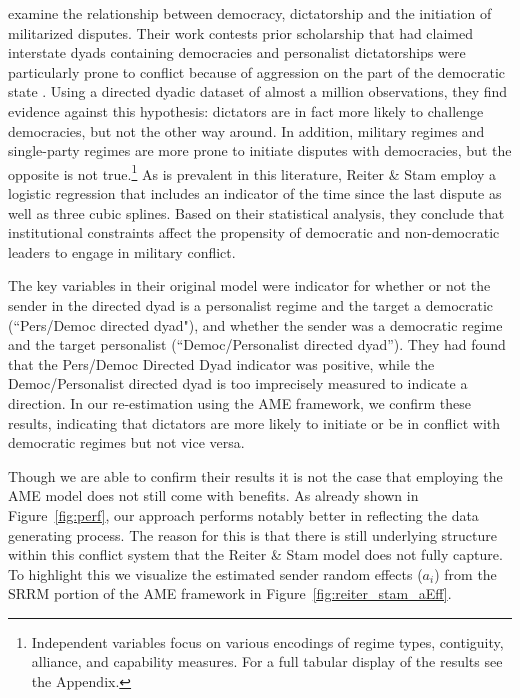 \citet{reiter:stam:2003} examine the relationship between democracy, dictatorship and the initiation of militarized disputes. Their work contests prior scholarship that had claimed interstate dyads containing democracies and personalist dictatorships were particularly prone to conflict because of aggression on the part of the democratic state \citep{peceny:etal:2002}. Using a directed dyadic dataset of almost a million observations, they find evidence against this hypothesis: dictators are in fact more likely to challenge democracies, but not the other way around. In addition, military regimes and single-party regimes are more prone to initiate disputes with democracies, but the opposite is not true.\footnote{Independent variables focus on various encodings of regime types, contiguity, alliance, and capability measures. For a full tabular display of the results see the Appendix.} As is prevalent in this literature, Reiter \& Stam employ a logistic regression that includes an indicator of the time since the last dispute as well as three cubic splines. Based on their statistical analysis, they conclude that institutional constraints affect the propensity of democratic and non-democratic leaders to engage in military conflict. 

The key variables in their original model were indicator for whether or not the sender in the directed dyad is a personalist regime and the target a democratic (``Pers/Democ directed dyad"), and whether the sender was a democratic regime and the target personalist (``Democ/Personalist directed dyad''). They had found that the Pers/Democ Directed Dyad indicator was positive, while the Democ/Personalist directed dyad is too imprecisely measured to indicate a direction. In our re-estimation using the AME framework, we confirm these results, indicating that dictators are more likely to initiate or be in conflict with democratic regimes but not vice versa. 

Though we are able to confirm their results it is not the case that employing the AME model does not still come with benefits. As already shown in Figure~\ref{fig:perf}, our approach performs notably better in reflecting the data generating process. The reason for this is that there is still underlying structure within this conflict system that the Reiter \& Stam model does not fully capture. To highlight this we visualize the estimated sender random effects ($a_{i}$) from the SRRM portion of the AME framework in Figure~\ref{fig:reiter_stam_aEff}. 

